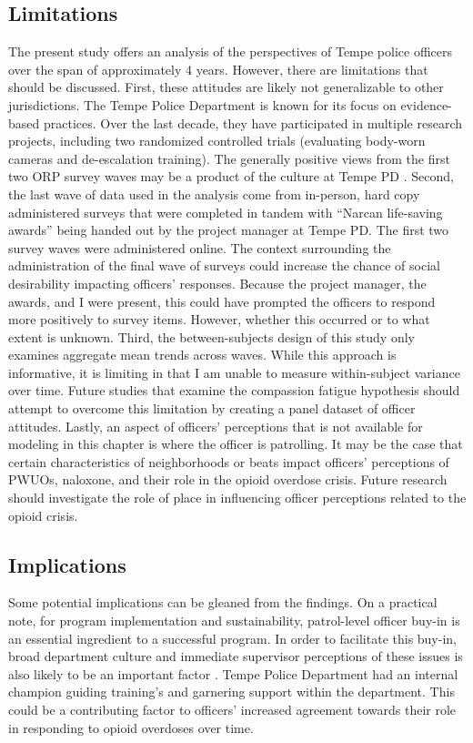 \subsection{Limitations}
The present study offers an analysis of the perspectives of Tempe police officers over the span of approximately 4 years. However, there are limitations that should be discussed. First, these attitudes are likely not generalizable to other jurisdictions. The Tempe Police Department is known for its focus on evidence-based practices. Over the last decade, they have participated in multiple research projects, including two randomized controlled trials (evaluating body-worn cameras and de-escalation training). The generally positive views from the first two ORP survey waves may be a product of the culture at Tempe PD \parencite{white_narcan_2021}. Second, the last wave of data used in the analysis come from in-person, hard copy administered surveys that were completed in tandem with “Narcan life-saving awards” being handed out by the project manager at Tempe PD. The first two survey waves were administered online. The context surrounding the administration of the final wave of surveys could increase the chance of social desirability impacting officers’ responses. Because the project manager, the awards, and I were present, this could have prompted the officers to respond more positively to survey items. However, whether this occurred or to what extent is unknown. Third, the between-subjects design of this study only examines aggregate mean trends across waves. While this approach is informative, it is limiting in that I am unable to measure within-subject variance over time. Future studies that examine the compassion fatigue hypothesis should attempt to overcome this limitation by creating a panel dataset of officer attitudes. Lastly, an aspect of officers' perceptions that is not available for modeling in this chapter is where the officer is patrolling. It may be the case that certain characteristics of neighborhoods or beats impact officers' perceptions of PWUOs, naloxone, and their role in the opioid overdose crisis. Future research should investigate the role of place in influencing officer perceptions related to the opioid crisis. 

\subsection{Implications}
Some potential implications can be gleaned from the findings. On a practical note, for program implementation and sustainability, patrol-level officer buy-in is an essential ingredient to a successful program. In order to facilitate this buy-in, broad department culture and immediate supervisor perceptions of these issues is also likely to be an important factor \parencite{del_pozo_police_2024}. Tempe Police Department had an internal champion guiding training's and garnering support within the department. This could be a contributing factor to officers' increased agreement towards their role in responding to opioid overdoses over time. 

